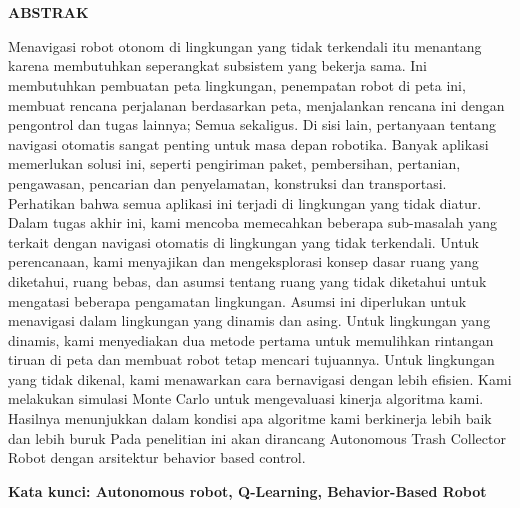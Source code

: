 \chapter*{}
\vspace*{-1.0cm}
\begin{center}
\normalfont\LARGE\textbf{ABSTRAK}
\end{center}

Menavigasi robot otonom di lingkungan yang tidak terkendali itu menantang 
karena membutuhkan seperangkat subsistem yang bekerja sama. 
Ini membutuhkan pembuatan peta lingkungan, penempatan robot di peta ini, 
membuat rencana perjalanan berdasarkan peta, menjalankan rencana ini dengan pengontrol dan tugas lainnya; 
Semua sekaligus. Di sisi lain, pertanyaan tentang navigasi otomatis sangat penting untuk masa depan robotika. 
Banyak aplikasi  memerlukan solusi ini, seperti pengiriman paket, pembersihan, pertanian, pengawasan, 
pencarian dan penyelamatan, konstruksi dan transportasi. Perhatikan bahwa semua aplikasi ini terjadi di lingkungan yang tidak diatur. 
Dalam tugas akhir ini, kami mencoba memecahkan beberapa sub-masalah yang terkait dengan navigasi otomatis di lingkungan yang tidak terkendali. 
Untuk perencanaan, kami menyajikan dan mengeksplorasi konsep dasar ruang yang diketahui, ruang bebas, 
dan asumsi tentang ruang yang tidak diketahui untuk mengatasi beberapa pengamatan lingkungan. 
Asumsi ini diperlukan untuk menavigasi dalam lingkungan yang dinamis dan asing. Untuk lingkungan yang dinamis, 
kami menyediakan dua metode pertama untuk memulihkan rintangan tiruan di peta dan membuat robot tetap mencari tujuannya. 
Untuk lingkungan yang tidak dikenal, kami menawarkan cara bernavigasi dengan lebih efisien. 
Kami melakukan simulasi Monte Carlo untuk mengevaluasi kinerja algoritma kami. 
Hasilnya menunjukkan dalam kondisi apa algoritme kami berkinerja lebih baik dan lebih buruk
Pada penelitian ini akan dirancang Autonomous Trash Collector Robot dengan arsitektur behavior based control. 

\textbf{Kata kunci: Autonomous robot, Q-Learning, Behavior-Based Robot} 